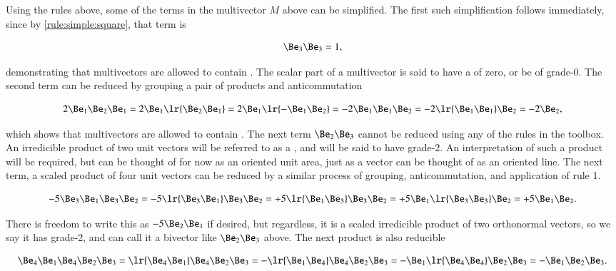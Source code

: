 Using the rules above, some of the terms in the multivector \( M \) above can be simplified.  The first such simplification follows immediately, since by \ref{rule:simple:square}, that term is

\begin{equation}\label{eqn:SimpleProducts:40}
\Be_3 \Be_3 = 1,
\end{equation}

demonstrating that multivectors are allowed to contain .  The scalar part of a multivector is said to have a  of zero, or be of grade-0.  The second term can be reduced by grouping a pair of products and anticommutation

\begin{dmath}\label{eqn:SimpleProducts:60}
2 \Be_1 \Be_2 \Be_1
=
2 \Be_1 \lr{ \Be_2 \Be_1 }
=
2 \Be_1 \lr{ - \Be_1 \Be_2 }
=
-2 \Be_1 \Be_1 \Be_2
=
-2 \lr{ \Be_1 \Be_1 } \Be_2
=
-2 \Be_2,
\end{dmath}

which shows that multivectors are allowed to contain .
The next term \( \Be_2 \Be_3 \) cannot be reduced using any of the rules in the toolbox.  An irredicible product of two unit vectors will be referred to as a , and will be said to have grade-2.  An interpretation of such a product will be required, but can be thought of for now as an oriented unit area, just as a vector can be thought of as an oriented line.  The next term, a scaled product of four unit vectors can be reduced by a similar process of grouping, anticommutation, and application of rule 1.

\begin{dmath}\label{eqn:SimpleProducts:80}
- 5 \Be_3 \Be_1 \Be_3 \Be_2
=
- 5 \lr{ \Be_3 \Be_1 } \Be_3 \Be_2
=
+ 5 \lr{ \Be_1 \Be_3 } \Be_3 \Be_2
=
+ 5 \Be_1 \lr{ \Be_3 \Be_3 } \Be_2
=
+ 5 \Be_1 \Be_2.
\end{dmath}

There is freedom to write this as \( - 5 \Be_2 \Be_1 \) if desired, but regardless, it is a
scaled irredicible product of two orthonormal vectors, so we say it has grade-2, and can call it a bivector like \( \Be_2 \Be_3 \) above.  The next product is also reducible

\begin{dmath}\label{eqn:SimpleProducts:100}
\Be_4 \Be_1 \Be_4 \Be_2 \Be_3
=
\lr{ \Be_4 \Be_1} \Be_4 \Be_2 \Be_3
=
-\lr{ \Be_1 \Be_4} \Be_4 \Be_2 \Be_3
=
- \Be_1 \lr{ \Be_4 \Be_4 } \Be_2 \Be_3
=
- \Be_1 \Be_2 \Be_3.
\end{dmath}

